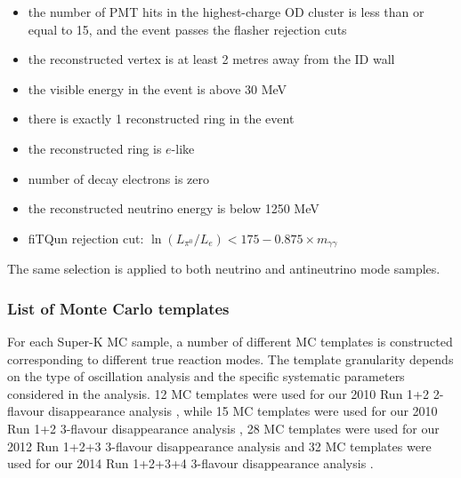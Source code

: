 \begin{itemize}
\item
the number of PMT hits in the highest-charge OD cluster is less than or
equal to 15, and the event passes the flasher rejection cuts
\item
the reconstructed vertex is at least 2 metres away from the ID wall 
\item
the visible energy in the event is above 30 MeV 
\item
there is exactly 1 reconstructed ring in the event 
\item
the reconstructed ring is $e$-like 
\item
number of decay electrons is zero
\item
the reconstructed neutrino energy is below 1250 MeV
\item
fiTQun rejection cut: $\ln (L_{\pi^0} / L_e ) < 175 - 0.875 \times m_{\gamma \gamma} $
\end{itemize}

The same selection is applied to both neutrino and antineutrino mode samples.


\subsubsection {List of Monte Carlo templates}
\label{sec:mc_templates:template_list}

For each Super-K MC sample, a number of different MC templates is constructed 
corresponding to different true reaction modes.
The template granularity depends on the type of oscillation analysis and the specific 
systematic parameters considered in the analysis.
12 MC templates were used for our 2010 Run 1+2 2-flavour disappearance analysis \cite{OurRun12DisappAnalysis}, while
15 MC templates were used for our 2010 Run 1+2 3-flavour disappearance analysis \cite{OurRun12DisappAnalysis3Flavour},
28 MC templates were used for our 2012 Run 1+2+3 3-flavour disappearance analysis \cite{OurRun123DisappAnalysis3Flavour} and
32 MC templates were used for our 2014 Run 1+2+3+4 3-flavour disappearance analysis \cite{OurRun1234DisappAnalysis3Flavour}.

